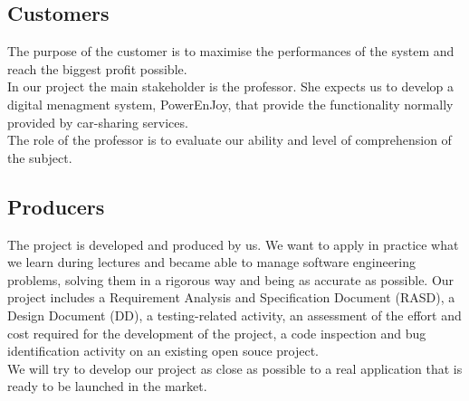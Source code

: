 \subsection{Customers}%
 The purpose of the customer is to maximise the performances of the system and reach the biggest profit possible.
\\In our project the main stakeholder is the professor. She expects us to develop a digital menagment system, PowerEnJoy, that provide the functionality normally provided by car-sharing services.  
\\The role of the professor is to evaluate our ability and level of comprehension of the subject. 
\subsection{Producers}
The project is developed and produced by us. We want to apply in practice what we learn during lectures and became able to manage software engineering problems, solving them in a rigorous way and being as accurate as possible. Our project includes a Requirement Analysis and Specification Document (RASD), a Design Document (DD), a testing-related activity, an
assessment of the effort and cost required for the development of the project, a code inspection and bug identification activity on an existing open souce project. 
\\We will try to develop our project as close as possible to a real application that is ready to be launched in the market.